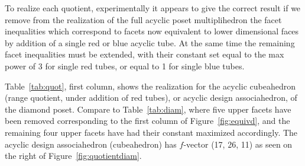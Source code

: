 \documentclass{article}
\begin{document}
To realize each quotient, experimentally it appears to give the correct result if we remove from the realization of the full acyclic poset multiplihedron the facet inequalities which correspond to facets now equivalent to lower dimensional faces by addition of a single red or blue acyclic tube. At the same time the remaining facet inequalities must be extended, with their constant set equal to the max power of 3 for single red tubes, or equal to 1 for single blue tubes. 






Table~\ref{tab:quot}, first column, shows the realization for the acyclic cubeahedron (range quotient, under addition of red tubes), or acyclic design associahedron, of the diamond poset. Compare to Table~\ref{tab:diam}, where five upper facets have been removed corresponding to the first column of Figure~\ref{fig:equivd}, and the remaining four upper facets have had their constant maximized accordingly. The acyclic design associahedron (cubeahedron) has $f$-vector (17, 26, 11) as seen on the right of Figure~\ref{fig:quotientdiam}.\\


\end{document}
